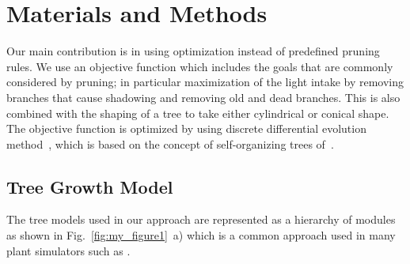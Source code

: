 \section{Materials and Methods}\label{sec:intro}
Our main contribution is in using optimization instead of predefined pruning rules. We use an objective function which includes the goals that are commonly considered by pruning; in particular maximization of the light intake by removing branches that cause shadowing and removing old and dead branches. This is also combined with the shaping of a tree to take either cylindrical or conical shape. 
The objective function is optimized by using discrete differential evolution method~\cite{kohek_eduapple:_2015}, which is based on the
concept of self-organizing trees of~\cite{palubicki_self-organizing_2009}.


\subsection{Tree Growth Model}
The tree models used in our approach are represented as a hierarchy of
modules as shown in Fig.~\ref{fig:my_figure1}~a) which is a common approach used in many plant
simulators such as \cite{de_reffye_plant_1988,kang2016imapple,palubicki_self-organizing_2009,pirk_plastic_2012,prusinkiewicz_development_1988,stava_inverse_2014}. 

